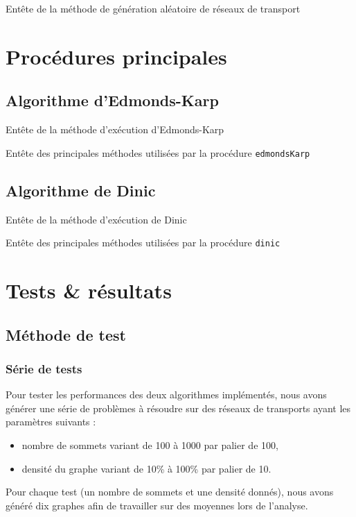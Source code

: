 Entête de la méthode de génération aléatoire de réseaux de transport


\section{Procédures principales}

\subsection{Algorithme d'Edmonds-Karp}

Entête de la méthode d'exécution d'Edmonds-Karp


Entête des principales méthodes utilisées par la procédure \texttt{edmondsKarp}


\subsection{Algorithme de Dinic}

Entête de la méthode d'exécution de Dinic


Entête des principales méthodes utilisées par la procédure \texttt{dinic}


\section{Tests \& résultats}

\subsection{Méthode de test}

\subsubsection{Série de tests}
Pour tester les performances des deux algorithmes implémentés, nous avons générer une série de problèmes à résoudre sur des réseaux de transports ayant les paramètres suivants :
\begin{itemize}
\item nombre de sommets variant de 100 à 1000 par palier de 100,
\item densité du graphe variant de 10\% à 100\% par palier de 10.
\end{itemize}
Pour chaque test (un nombre de sommets et une densité donnés), nous avons généré dix graphes afin de travailler sur des moyennes lors de l'analyse.

